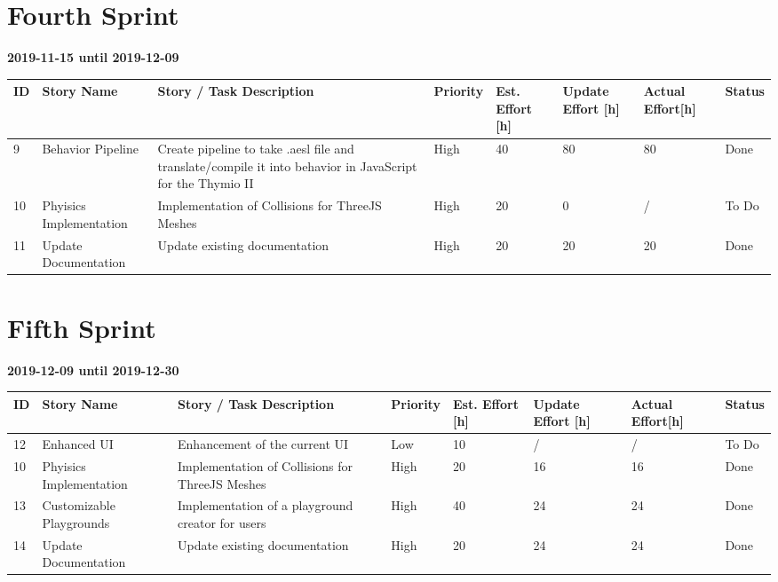 \documentclass{scrreprt}
\begin{document}
\section{Fourth Sprint}
\textbf{2019-11-15 until 2019-12-09}
\begin{longtable}{p{5mm}|p{2cm}|p{4cm}|p{1cm}|p{1cm}|p{1cm}|p{1cm}|p{15mm}}
  ID                     & Story Name & Story / Task Description & Priority & Est. Effort {[}h{]} & Update Effort {[}h{]} & Actual Effort{[}h{]} & Status                \\ \hline
  9 & Behavior Pipeline & Create pipeline to take .aesl file and translate/compile it into behavior in JavaScript for the Thymio II & High & 40 & 80 & 80 & Done \\ 
  10 & Phyisics Implementation & Implementation of Collisions for ThreeJS Meshes & High & 20 & 0 & {/} & To Do \\
  11 & Update Documentation & Update existing documentation & High & 20 & 20 & 20 & Done \\ 
\end{longtable}

\section{Fifth Sprint}
\textbf{2019-12-09 until 2019-12-30}
\begin{longtable}{p{5mm}|p{2cm}|p{4cm}|p{1cm}|p{1cm}|p{1cm}|p{1cm}|p{15mm}}
  ID                     & Story Name & Story / Task Description & Priority & Est. Effort {[}h{]} & Update Effort {[}h{]} & Actual Effort{[}h{]} & Status                \\ \hline
  12 & Enhanced UI & Enhancement of the current UI & Low & 10 & {/} & {/} & To Do \\ 
  10 & Phyisics Implementation & Implementation of Collisions for ThreeJS Meshes & High & 20 & 16 & 16 & Done \\
  13 & Customizable Playgrounds & Implementation of a playground creator for users & High & 40 & 24 & 24 & Done \\ 
  14 & Update Documentation & Update existing documentation & High & 20 & 24 & 24 & Done \\ 
\end{longtable}
\end{document}
